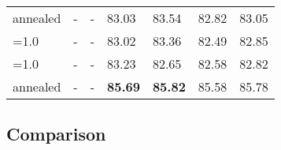 \documentclass[letterpaper]{article} \usepackage{aaai18}  \usepackage{times}  \usepackage{helvet}  \usepackage{courier}  \usepackage{url}  \usepackage{graphicx}  \frenchspacing
\begin{document}
\begin{table*}[t]
{\begin{tabular}{lllllll}
 annealed    & -        & -       & 83.03        & 83.54      &    82.82     & 83.05\\        
=1.0 & -        & -       & 83.02        & 83.36      &    82.49     & 82.85\\       
=1.0 & -        & -       & 83.23        & 82.65      &    82.58     & 82.82\\  
 annealed    & -        & -       & \bf 85.69        & \bf 85.82     &    85.58     & 85.78\\  
\bottomrule
\end{tabular}
}
\end{table*} \hspace{-0.2cm}\begin{table*}[t]\centering
\caption{Results on Named Entity Recognition. Macro F1 over the prediction of different named entities is reported that is a standard evaluation metric for this task.}
\label{NER}
\end{table*} \subsection{Comparison}
\end{document}
